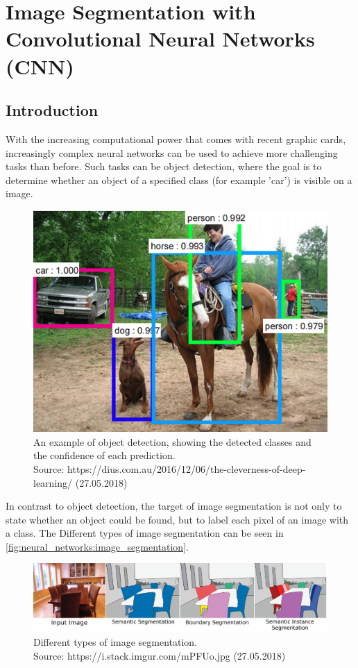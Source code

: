 
\chapter{Image Segmentation with Convolutional Neural Networks (CNN)}
\section{Introduction}
With the increasing computational power that comes with recent graphic cards, increasingly complex neural networks can be used to achieve more challenging tasks than before. Such tasks can be object detection, where the goal is to determine whether an object of a specified class (for example 'car') is visible on a image. 

\begin{figure}[H]
    \centering
	\includegraphics[width=0.6\linewidth]{chapters/neural_networks/images/object_detection.png}
	\caption{An example of object detection, showing the detected classes and the confidence of each prediction.\\ Source: https://dius.com.au/2016/12/06/the-cleverness-of-deep-learning/ (27.05.2018)}
	\label{fig:neural_networks:object_detection}
\end{figure}

In contrast to object detection, the target of image segmentation is not only to state whether an object could be found, but to label each pixel of an image with a class. The Different types of image segmentation can be seen in \autoref{fig:neural_networks:image_segmentation}.

\begin{figure}[H]
    \centering
	\includegraphics[width=0.6\linewidth]{chapters/neural_networks/images/segmentation.jpg}
	\caption{Different types of image segmentation.\\ Source: https://i.stack.imgur.com/mPFUo.jpg (27.05.2018)}
	\label{fig:neural_networks:image_segmentation}
\end{figure}

